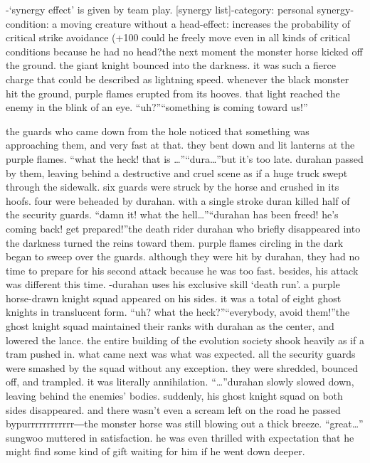 -‘synergy effect’ is given by team play.
[synergy list]-category: personal synergy-condition: a moving creature without a head-effect: increases the probability of critical strike avoidance (+100%
 could he freely move even in all kinds of critical conditions because he had no head?the next moment the monster horse kicked off the ground.
 the giant knight bounced into the darkness.
 it was such a fierce charge that could be described as lightning speed.
whenever the black monster hit the ground, purple flames erupted from its hooves.
 that light reached the enemy in the blink of an eye.
“uh?”“something is coming toward us!”

the guards who came down from the hole noticed that something was approaching them, and very fast at that.
 they bent down and lit lanterns at the purple flames.
“what the heck! that is …”“dura…”but it’s too late.
 durahan passed by them, leaving behind a destructive and cruel scene as if a huge truck swept through the sidewalk.
six guards were struck by the horse and crushed in its hoofs.
 four were beheaded by durahan.
 with a single stroke duran killed half of the security guards.
“damn it! what the hell…”“durahan has been freed! he’s coming back! get prepared!”the death rider durahan who briefly disappeared into the darkness turned the reins toward them.
 purple flames circling in the dark began to sweep over the guards.
although they were hit by durahan, they had no time to prepare for his second attack because he was too fast.
besides, his attack was different this time.
-durahan uses his exclusive skill ‘death run’.
a purple horse-drawn knight squad appeared on his sides.
 it was a total of eight ghost knights in translucent form.
“uh? what the heck?”“everybody, avoid them!”the ghost knight squad maintained their ranks with durahan as the center, and lowered the lance.
 the entire building of the evolution society shook heavily as if a tram pushed in.
what came next was what was expected.
 all the security guards were smashed by the squad without any exception.
 they were shredded, bounced off, and trampled.
 it was literally annihilation.
“…”durahan slowly slowed down, leaving behind the enemies’ bodies.
 suddenly, his ghost knight squad on both sides disappeared.
 and there wasn’t even a scream left on the road he passed bypurrrrrrrrrrrr―the monster horse was still blowing out a thick breeze.
“great…” sungwoo muttered in satisfaction.
he was even thrilled with expectation that he might find some kind of gift waiting for him if he went down deeper.


 
